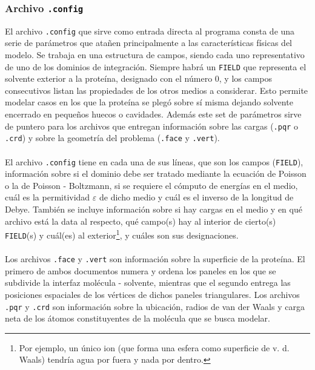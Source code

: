 \documentclass[12pt, oneside, numbers, spanish]{ezthesis}
\numberwithin{equation}{section}
\begin{document}
\subsubsection{Archivo \texttt{.config}}
El archivo \texttt{.config} que sirve como entrada directa al programa consta de una serie de parámetros que atañen principalmente a las características físicas del modelo. Se trabaja en una estructura de campos, siendo cada uno representativo de uno de los dominios de integración. Siempre habrá un \texttt{FIELD} que representa el solvente exterior a la proteína, designado con el número 0, y los campos consecutivos listan las propiedades de los otros medios a considerar. Esto permite modelar casos en los que la proteína se plegó sobre sí misma dejando solvente encerrado en pequeños huecos o cavidades. Además este set de parámetros sirve de puntero para los archivos que entregan información sobre las cargas (\texttt{.pqr} o \texttt{.crd}) y sobre la geometría del problema (\texttt{.face} y \texttt{.vert}).\\\\
El archivo \texttt{.config} tiene en cada una de sus líneas, que son los campos (\texttt{FIELD}), información sobre si el dominio debe ser tratado mediante la ecuación de Poisson o la de Poisson - Boltzmann, si se requiere el cómputo de energías en el medio, cuál es la permitividad $\varepsilon$ de dicho medio y cuál es el inverso de la longitud de Debye. También se incluye información sobre si hay cargas en el medio y en qué archivo está la data al respecto, qué campo(s) hay al interior de cierto(s) \texttt{FIELD}(s) y cuál(es) al exterior\footnote{Por ejemplo, un único ion (que forma una esfera como superficie de v. d. Waals) tendría agua por fuera y nada por dentro.}, y cuáles son sus designaciones.\\\\
Los archivos \texttt{.face} y \texttt{.vert} son información sobre la superficie de la proteína. El primero de ambos documentos numera y ordena los paneles en los que se subdivide la interfaz molécula - solvente, mientras que el segundo entrega las posiciones espaciales de los vértices de dichos paneles triangulares. Los archivos \texttt{.pqr} y \texttt{.crd} son información sobre la ubicación, radios de van der Waals y carga neta de los átomos constituyentes de la molécula que se busca modelar.
\end{document}
